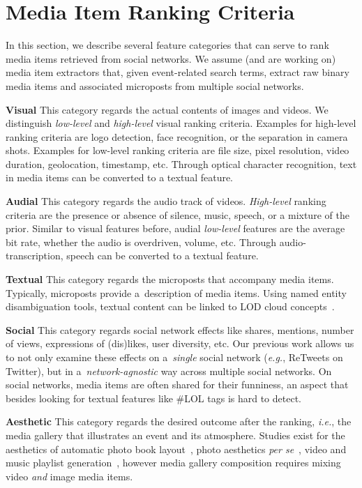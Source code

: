 \documentclass{article}
\begin{document}
\section{Media Item Ranking Criteria}
In this section, we describe several feature categories that can serve to rank
media items retrieved from social networks. 
We assume (and are working on) media item extractors that,
given event-related search terms,
extract raw binary media items and associated microposts
from multiple social networks.

\noindent \textbf{Visual}
This category regards the actual contents of images and videos.
We distinguish \emph{low-level} and \emph{high-level} visual ranking criteria.
Examples for high-level ranking criteria are logo detection,
face recognition, or the separation in camera shots.
Examples for low-level ranking criteria are file size, pixel resolution,
video duration, geolocation, timestamp, etc.
Through optical character recognition,
text in media items can be converted to a textual feature.

\noindent \textbf{Audial}
This category regards the audio track of videos.
\emph{High-level} ranking criteria are the presence or absence
of silence, music, speech, or a mixture of the prior.
Similar to visual features before,
audial \emph{low-level}  features are the average bit rate,
whether the audio is overdriven, volume, etc.
Through audio-transcription, speech can be converted to a textual feature.

\noindent \textbf{Textual}
This category regards the microposts that accompany media items.
Typically, microposts provide a~description of media items.
Using named entity disambiguation tools,
textual content can be linked to LOD cloud concepts~\cite{Facebook2011}.

\noindent \textbf{Social}
This category regards social network effects like shares, mentions,
number of views, expressions of (dis)likes, user diversity, etc.
Our previous work allows us to not only examine these effects
on a~\emph{single} social network (\emph{e.g.}, ReTweets on Twitter),
but in a~\emph{network-agnostic} way across multiple social networks.
On social networks, media items are often shared for their funniness,
an aspect that besides looking for textual features
like \#LOL tags is hard to detect.

\noindent \textbf{Aesthetic}
This category regards the desired outcome after the ranking, \emph{i.e.},
the media gallery that illustrates an event and its atmosphere.
Studies exist for the aesthetics of
automatic photo book layout~\cite{Photo2011},
photo aesthetics \emph{per se}~\cite{Photo2012},
video and music playlist generation~\cite{YouTube2010,Playlist2006},
however media gallery composition requires mixing video
\emph{and} image media items.
\end{document}
